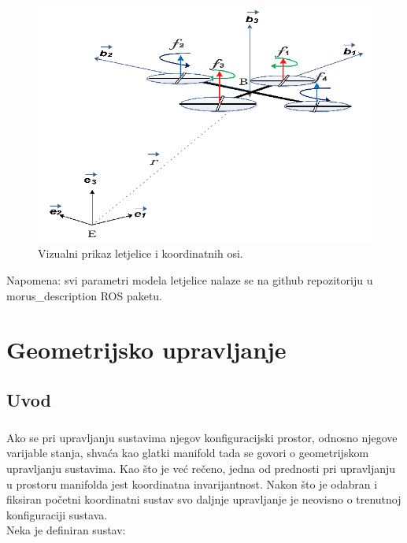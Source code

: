 \documentclass[times, utf8, diplomski]{fer}
\begin{document}
\begin{figure}[h!]
	\includegraphics[width=\textwidth]{model.png}
	\caption{Vizualni prikaz letjelice i koordinatnih osi.}
\end{figure}
Napomena: svi parametri modela letjelice nalaze se na github repozitoriju u morus\_description ROS paketu.
\chapter{Geometrijsko upravljanje}

	\section{Uvod}
	
	\paragraph{}Ako se pri upravljanju sustavima njegov konfiguracijski prostor, odnosno njegove varijable stanja, shvaća kao glatki manifold tada se govori o geometrijskom upravljanju sustavima. Kao što je već rečeno, jedna od prednosti pri upravljanju u prostoru manifolda jest koordinatna invarijantnost. Nakon što je odabran i fiksiran početni koordinatni sustav svo daljnje upravljanje je neovisno o trenutnoj konfiguraciji sustava. \\
	Neka je definiran sustav:
	
\end{document}
